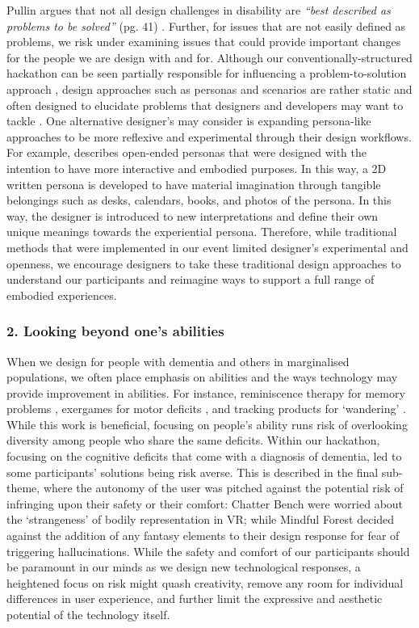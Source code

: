Pullin argues that not all design challenges in disability are \textit{“best described as problems to be solved”} (pg. 41) \citep{pullin2009design}. Further, for issues that are not easily defined as problems, we risk under examining issues that could provide important changes for the people we are design with and for. Although our conventionally-structured hackathon can be seen partially responsible for influencing a problem-to-solution approach \citep{hope_hackathons_2019}, design approaches such as personas and scenarios are rather static and often designed to elucidate problems that designers and developers may want to tackle \citep{cutting_can_2019}. One alternative designer’s may consider is expanding persona-like approaches to be more reflexive and experimental through their design workflows. For example, \citep{leong2021experiential} describes open-ended personas that were designed with the intention to have more interactive and embodied purposes. In this way, a 2D written persona is developed to have material imagination through tangible belongings such as desks, calendars, books, and photos of the persona. In this way, the designer is introduced to new interpretations and define their own unique meanings towards the experiential persona. Therefore, while traditional methods that were implemented in our event limited designer’s experimental and openness, we encourage designers to take these traditional design approaches to understand our participants and reimagine ways to support a full range of embodied experiences. 

\subsubsection{2. Looking beyond one's abilities}
\label{sterotype:Two}
When we design for people with dementia and others in marginalised populations, we often place emphasis on abilities and the ways technology may provide improvement in abilities. For instance, reminiscence therapy for memory problems \citep{astell_stimulating_2010}, exergames for motor deficits \citep{unbehaun_exploring_2018}, and tracking products for ‘wandering’ \citep{kearns_attitudes_2007}. While this work is beneficial, focusing on people’s ability runs risk of overlooking diversity among people who share the same deficits. Within our hackathon, focusing on the cognitive deficits that come with a diagnosis of dementia, led to some participants’ solutions being risk averse. This is described in the final sub-theme, where the autonomy of the user was pitched against the potential risk of infringing upon their safety or their comfort: Chatter Bench were worried about the ‘strangeness’ of bodily representation in VR; while Mindful Forest decided against the addition of any fantasy elements to their design response for fear of triggering hallucinations. While the safety and comfort of our participants should be paramount in our minds as we design new technological responses, a heightened focus on risk might quash creativity, remove any room for individual differences in user experience, and further limit the expressive and aesthetic potential of the technology itself. 

